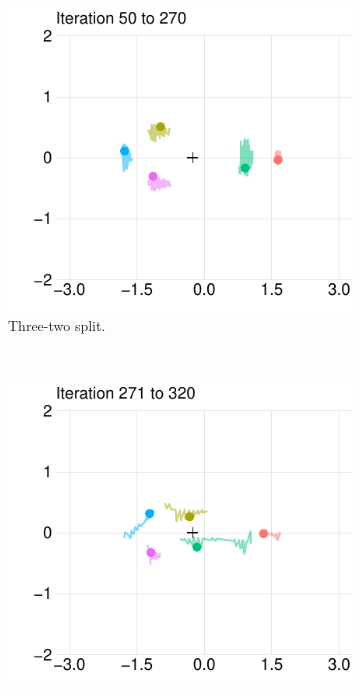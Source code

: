 \documentclass[preprint, 12pt]{elsarticle}
\begin{document}
\begin{figure}[hb!]
	\centering
	\caption{Trajectory plot for five \emph{maxcov-inductor-GA} firms at different iteration intervals ($\mu=1.3, n_l/n_r=1.5$). The dots indicate the location after respective 270, 320 and 2,500 iterations and the lines indicate the location in preceding iterations. The black cross indicates the average ideal point of all consumers.}
	
	\begin{subfigure}[t]{0.315\textwidth}
		\centering
		\includegraphics[width=\textwidth, trim={6mm 0 2mm 0}]{Graphics/fig6m_miga1.pdf}
		\caption{Three-two split.}
		\label{fig:five32}
	\end{subfigure}
	~
	\begin{subfigure}[t]{0.315\textwidth}
		\centering
		\includegraphics[width=\textwidth, trim={6mm 0 2mm 0}]{Graphics/fig6m_miga2.pdf}

\end{subfigure}
\end{figure}
\end{document}

